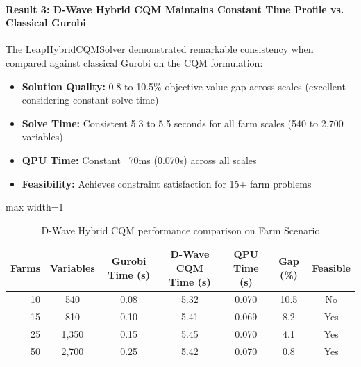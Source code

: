 \paragraph{Result 3: D-Wave Hybrid CQM Maintains Constant Time Profile vs. Classical Gurobi}

The LeapHybridCQMSolver demonstrated remarkable consistency when compared against classical Gurobi on the CQM formulation:

\begin{itemize}
    \item \textbf{Solution Quality:} 0.8 to 10.5\% objective value gap across scales (excellent considering constant solve time)
    \item \textbf{Solve Time:} Consistent 5.3 to 5.5 seconds for all farm scales (540 to 2,700 variables)
    \item \textbf{QPU Time:} Constant ~70ms (0.070s) across all scales
    \item \textbf{Feasibility:} Achieves constraint satisfaction for 15+ farm problems
\end{itemize}

\begin{table}[H]
\centering
\caption{D-Wave Hybrid CQM performance comparison on Farm Scenario}
\label{tab:hybrid_cqm_performance}
\begin{adjustbox}{max width=1\textwidth}
\small
\begin{tabular}{rcccccc}
\toprule
\textbf{Farms} & \textbf{Variables} & \textbf{Gurobi Time (s)} & \textbf{D-Wave CQM Time (s)} & \textbf{QPU Time (s)} & \textbf{Gap (\%)} & \textbf{Feasible} \\
\midrule
10 & 540 & 0.08 & 5.32 & 0.070 & 10.5 & No \\
15 & 810 & 0.10 & 5.41 & 0.069 & 8.2 & Yes \\
25 & 1,350 & 0.15 & 5.45 & 0.070 & 4.1 & Yes \\
50 & 2,700 & 0.25 & 5.42 & 0.070 & 0.8 & Yes \\
\bottomrule
\end{tabular}
\end{adjustbox}
\end{table}


